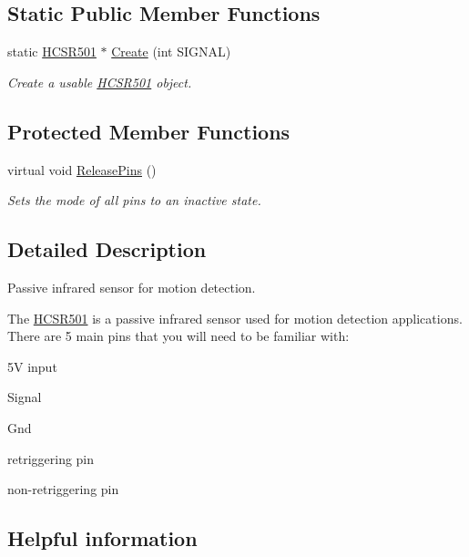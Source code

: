 \subsection*{Static Public Member Functions}
\begin{DoxyCompactItemize}
\item 
static \hyperlink{classraspboop_1_1HCSR501}{H\-C\-S\-R501} $\ast$ \hyperlink{classraspboop_1_1HCSR501_ad2a07d3f130362206c5fbcce92d41294}{Create} (int S\-I\-G\-N\-A\-L)
\begin{DoxyCompactList}\small\item\em Create a usable \hyperlink{classraspboop_1_1HCSR501}{H\-C\-S\-R501} object. \end{DoxyCompactList}\end{DoxyCompactItemize}
\subsection*{Protected Member Functions}
\begin{DoxyCompactItemize}
\item 
virtual void \hyperlink{classraspboop_1_1HCSR501_aa8609b3c9529ff3863d47010fc9e78d0}{Release\-Pins} ()
\begin{DoxyCompactList}\small\item\em Sets the mode of all pins to an inactive state. \end{DoxyCompactList}\end{DoxyCompactItemize}


\subsection{Detailed Description}
Passive infrared sensor for motion detection. 

The \hyperlink{classraspboop_1_1HCSR501}{H\-C\-S\-R501} is a passive infrared sensor used for motion detection applications. There are 5 main pins that you will need to be familiar with\-:


\begin{DoxyItemize}
\item 5\-V input
\item Signal
\item Gnd
\item retriggering pin
\item non-\/retriggering pin
\end{DoxyItemize}

\subsection*{Helpful information }

